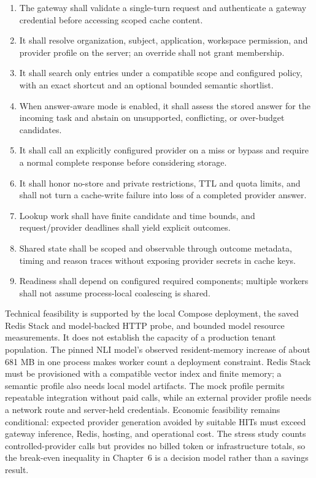 \begin{enumerate}
\item[FR1.] The gateway shall validate a single-turn request and authenticate a gateway credential before accessing scoped cache content.
\item[FR2.] It shall resolve organization, subject, application, workspace permission, and provider profile on the server; an override shall not grant membership.
\item[FR3.] It shall search only entries under a compatible scope and configured policy, with an exact shortcut and an optional bounded semantic shortlist.
\item[FR4.] When answer-aware mode is enabled, it shall assess the stored answer for the incoming task and abstain on unsupported, conflicting, or over-budget candidates.
\item[FR5.] It shall call an explicitly configured provider on a miss or bypass and require a normal complete response before considering storage.
\item[FR6.] It shall honor no-store and private restrictions, TTL and quota limits, and shall not turn a cache-write failure into loss of a completed provider answer.
\item[NFR1.] Lookup work shall have finite candidate and time bounds, and request/provider deadlines shall yield explicit outcomes.
\item[NFR2.] Shared state shall be scoped and observable through outcome metadata, timing and reason traces without exposing provider secrets in cache keys.
\item[NFR3.] Readiness shall depend on configured required components; multiple workers shall not assume process-local coalescing is shared.
\end{enumerate}

Technical feasibility is supported by the local Compose deployment, the saved Redis Stack and model-backed HTTP probe, and bounded model resource measurements. It does not establish the capacity of a production tenant population. The pinned NLI model's observed resident-memory increase of about 681 MB in one process makes worker count a deployment constraint. Redis Stack must be provisioned with a compatible vector index and finite memory; a semantic profile also needs local model artifacts. The mock profile permits repeatable integration without paid calls, while an external provider profile needs a network route and server-held credentials. Economic feasibility remains conditional: expected provider generation avoided by suitable HITs must exceed gateway inference, Redis, hosting, and operational cost. The stress study counts controlled-provider calls but provides no billed token or infrastructure totals, so the break-even inequality in Chapter~6 is a decision model rather than a savings result.
